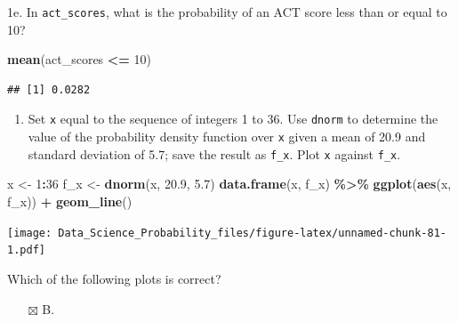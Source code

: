 \documentclass[
]{article}
\newenvironment{Shaded}{\begin{snugshade}}{\end{snugshade}}
\newcommand{\DecValTok}[1]{\textcolor[rgb]{0.00,0.00,0.81}{#1}}
\newcommand{\FloatTok}[1]{\textcolor[rgb]{0.00,0.00,0.81}{#1}}
\newcommand{\KeywordTok}[1]{\textcolor[rgb]{0.13,0.29,0.53}{\textbf{#1}}}
\newcommand{\NormalTok}[1]{#1}
\newcommand{\OperatorTok}[1]{\textcolor[rgb]{0.81,0.36,0.00}{\textbf{#1}}}
\newcommand{\StringTok}[1]{\textcolor[rgb]{0.31,0.60,0.02}{#1}}
\providecommand{\tightlist}{%
  \setlength{\itemsep}{0pt}\setlength{\parskip}{0pt}}
\begin{document}
1e. In \texttt{act\_scores}, what is the probability of an ACT score
less than or equal to 10?

\begin{Shaded}
\begin{Highlighting}[]
\KeywordTok{mean}\NormalTok{(act\_scores }\OperatorTok{\textless{}=}\StringTok{ }\DecValTok{10}\NormalTok{)}
\end{Highlighting}
\end{Shaded}

\begin{verbatim}
## [1] 0.0282
\end{verbatim}

\begin{enumerate}
\def\labelenumi{\arabic{enumi}.}
\setcounter{enumi}{1}
\tightlist
\item
  Set \texttt{x} equal to the sequence of integers 1 to 36. Use
  \texttt{dnorm} to determine the value of the probability density
  function over \texttt{x} given a mean of 20.9 and standard deviation
  of 5.7; save the result as \texttt{f\_x}. Plot \texttt{x} against
  \texttt{f\_x}.
\end{enumerate}

\begin{Shaded}
\begin{Highlighting}[]
\NormalTok{x \textless{}{-}}\StringTok{ }\DecValTok{1}\OperatorTok{:}\DecValTok{36}
\NormalTok{f\_x \textless{}{-}}\StringTok{ }\KeywordTok{dnorm}\NormalTok{(x, }\FloatTok{20.9}\NormalTok{, }\FloatTok{5.7}\NormalTok{)}
\KeywordTok{data.frame}\NormalTok{(x, f\_x) }\OperatorTok{\%\textgreater{}\%}
\StringTok{  }\KeywordTok{ggplot}\NormalTok{(}\KeywordTok{aes}\NormalTok{(x, f\_x)) }\OperatorTok{+}
\StringTok{  }\KeywordTok{geom\_line}\NormalTok{()}
\end{Highlighting}
\end{Shaded}

\texttt{[image: Data\_Science\_Probability\_files/figure-latex/unnamed-chunk-81-1.pdf]}

Which of the following plots is correct?

\begin{itemize}
\tightlist
\item[$\boxtimes$]
  B.
\end{itemize}
\end{document}
